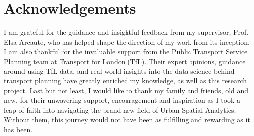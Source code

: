 \chapter*{Acknowledgements}
I am grateful for the guidance and insightful feedback from my supervisor, Prof. Elsa Arcaute, who has helped shape the direction of my work from its inception. I am also thankful for the invaluable support from the Public Transport Service Planning team at Transport for London (TfL). Their expert opinions, guidance around using TfL data, and real-world insights into the data science behind transport planning have greatly enriched my knowledge, as well as this research project. Last but not least, I would like to thank my family and friends, old and new, for their unwavering support, encouragement and inspiration as I took a leap of faith into navigating the brand new field of Urban Spatial Analytics. Without them, this journey would not have been as fulfilling and rewarding as it has been.

\tableofcontents

\listoffigures

\listoftables